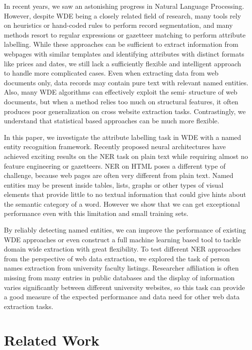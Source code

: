 \documentclass[sigconf]{acmart}
\begin{document}
In recent years, we saw an astonishing progress in Natural Language Processing.
However, despite WDE being a closely related field of research,
many tools rely on heuristics or hand-coded rules to perform record segmentation,
and many methods resort to regular expressions or gazetteer matching to perform attribute
labelling. While these approaches can be sufficient to extract information from webpages
with similar templates and identifying attributes with distinct formats like prices and
dates, we still lack a sufficiently flexible and intelligent approach to handle more complicated cases.
Even when extracting data from web documents only, data records may contain pure text with 
relevant named entities. Also, many WDE algorithms can effectively exploit the semi-
structure of web documents, but when a method relies too much on structural features, it
often produces poor generalization on cross website extraction tasks. Contrastingly, we 
understand that statistical based approaches can be much more flexible.

In this paper, we investigate the attribute labelling task in WDE with a named entity 
recognition framework. Recently proposed neural architectures have achieved exciting results 
on the NER task on plain text \cite{Huang2015, Lample2016, Ma2016} while requiring almost 
no feature engineering or gazetteers. NER on HTML poses a different type of challenge, 
because web pages are often very different from plain text. Named entities may be present 
inside tables, lists, graphs or other types of visual elements that provide
little to no textual information that could give hints about the semantic category of 
a word. However we show that we can get exceptional performance even with this limitation
and small training sets.

By reliably detecting named entities, we can improve the performance of existing WDE 
approaches or even construct a full machine learning based tool to tackle domain wide
extraction with great flexibility. To test different NER approaches from the perspective 
of web data extraction,
we explored the task of person names extraction from university faculty listings.
Researcher affiliation is often missing from many entries in public databases 
and the display of information varies significantly between different university 
websites, so this task can provide a good measure of the expected performance and
data need for other web data extraction tasks. 

\section{Related Work}
\end{document}
